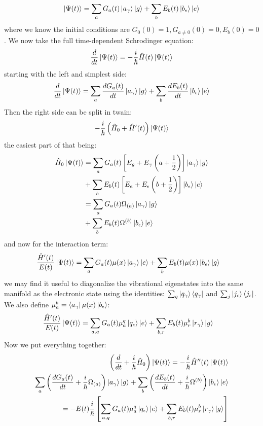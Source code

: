 \begin{align*}
	\ket{\Psi(t)} = \sum_{a} G_a(t) \ket{a_{\gamma}} \ket{g}  + \sum_{b} E_b(t) \ket{b_{\epsilon}} \ket{e}
\end{align*}
where we know the initial conditions are $G_0(0) = 1, G_{a\neq0}(0) = 0, E_b(0) = 0$.
We now take the full time-dependent Schrodinger equation:
\begin{align*}
	\frac{d}{dt}\ket{\Psi(t)} = -\frac{i}{\hbar}\hat{H}(t)\ket{\Psi(t)}
\end{align*}
starting with the left and simplest side:
\begin{align*}
	\frac{d}{dt}\ket{\Psi(t)} = \sum_{a} \frac{d G_a(t)}{dt} \ket{a_{\gamma}} \ket{g}  + \sum_{b} \frac{d E_b(t)}{dt} \ket{b_{\epsilon}} \ket{e}
\end{align*}
Then the right side can be split in twain:
\begin{align*}
	-\frac{i}{\hbar}\left( \hat{H}_0 + \hat{H}'(t)  \right) \ket{\Psi(t)}
\end{align*}
the easiest part of that being:
\begin{align*}
	\hat{H}_0  \ket{\Psi(t)} &= \sum_{a} G_a(t) \left[E_g + E_{\gamma}\left(a + \frac{1}{2}\right) \right]\ket{a_{\gamma}} \ket{g}  \\
	&+ \sum_{b} E_b(t) \left[E_e + E_{\epsilon}\left(b + \frac{1}{2}\right) \right] \ket{b_{\epsilon}} \ket{e}\\
	&= \sum_{a} G_a(t) \Omega_{(a)} \ket{a_{\gamma}} \ket{g}  \\
	&+ \sum_{b} E_b(t) \Omega^{(b)} \ket{b_{\epsilon}} \ket{e}
\end{align*}
and now for the interaction term:
\begin{align*}
	\frac{\hat{H}'(t)}{E(t)}  \ket{\Psi(t)} &= \sum_{a} G_a(t) \mu(x)\ket{a_{\gamma}} \ket{e}  + \sum_{b} E_b(t) \mu(x)\ket{b_{\epsilon}} \ket{g}
\end{align*}
we may find it useful to diagonalize the vibrational eigenstates into the same manifold as the electronic state using the identities: $\sum_{q}
\ket{q_{\gamma}}\bra{q_{\gamma}}$ and $\sum_{j}
\ket{j_{\epsilon}}\bra{j_{\epsilon}}$.  We also define $\mu_{a}^{b} = \bra{a_{\gamma}} \mu(x) \ket{b_{\epsilon}}$:
\begin{align*}
	\frac{\hat{H}'(t)}{E(t)}  \ket{\Psi(t)} &= \sum_{a, q} G_a(t) \mu_{a}^{q}\ket{q_{\epsilon}} \ket{e}  + \sum_{b,r} E_b(t) \mu_{r}^{b}\ket{r_{\gamma}} \ket{g}
\end{align*}
Now we put everything together:
\begin{align*}
	\left(\frac{d}{dt} +\frac{i}{\hbar}\hat{H}_0 \right)\ket{\Psi(t)}  = -\frac{i}{\hbar}\hat{H}''(t)\ket{\Psi(t)} \\
	\sum_{a} \left(\frac{d G_a(t)}{dt} + \frac{i}{\hbar}\Omega_{(a)}\right)\ket{a_{\gamma}} \ket{g}  + \sum_{b} \left(\frac{d E_b(t)}{dt} + \frac{i}{\hbar} \Omega^{(b)} \right)\ket{b_{\epsilon}} \ket{e}\\
	=-E(t)\frac{i}{\hbar} \left[\sum_{a, q} G_a(t) \mu_{a}^{q}\ket{q_{\epsilon}} \ket{e}  + \sum_{b,r} E_b(t) \mu_{r}^{b}\ket{r_{\gamma}} \ket{g} \right]
\end{align*}
